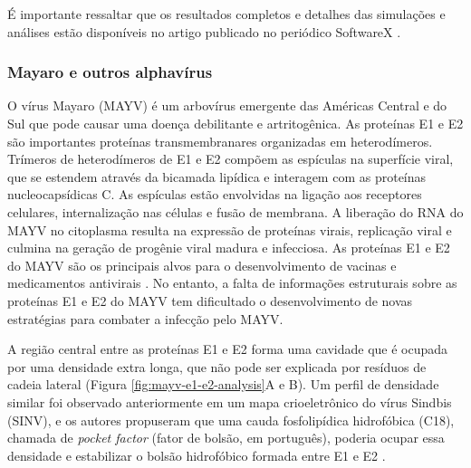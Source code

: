 \documentclass[Portugues]{phdquali}
\begin{document}
É importante ressaltar que os resultados completos e detalhes das simulações e análises estão disponíveis no artigo publicado no periódico SoftwareX \cite{guerra2020}.

\subsubsection{Mayaro e outros alphavírus}


O vírus Mayaro (MAYV) é um arbovírus emergente das Américas Central e do Sul que pode causar uma doença debilitante e artritogênica. As proteínas E1 e E2 são importantes proteínas transmembranares organizadas em heterodímeros. Trímeros de heterodímeros de E1 e E2 compõem as espículas na superfície viral, que se estendem através da bicamada lipídica e interagem com as proteínas nucleocapsídicas C. As espículas estão envolvidas na ligação aos receptores celulares, internalização nas células e fusão de membrana. A liberação do RNA do MAYV no citoplasma resulta na expressão de proteínas virais, replicação viral e culmina na geração de progênie viral madura e infecciosa. As proteínas E1 e E2 do MAYV são os principais alvos para o desenvolvimento de vacinas e medicamentos antivirais \cite{ribeiro2021}. No entanto, a falta de informações estruturais sobre as proteínas E1 e E2 do MAYV tem dificultado o desenvolvimento de novas estratégias para combater a infecção pelo MAYV.

A região central entre as proteínas E1 e E2 forma uma cavidade que é ocupada por uma densidade extra longa, que não pode ser explicada por resíduos de cadeia lateral (Figura \ref{fig:mayv-e1-e2-analysis}A e B). Um perfil de densidade similar foi observado anteriormente em um mapa crioeletrônico do vírus Sindbis (SINV), e os autores propuseram que uma cauda fosfolipídica hidrofóbica (C18), chamada de \textit{pocket factor} (fator de bolsão, em português), poderia ocupar essa densidade e estabilizar o bolsão hidrofóbico formada entre E1 e E2 \cite{chen2018}.
\end{document}
